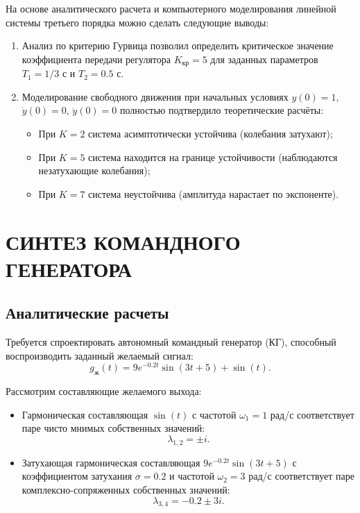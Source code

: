 \documentclass[14pt,a4paper]{extarticle}
\begin{document}
На основе аналитического расчета и компьютерного моделирования линейной системы третьего порядка можно сделать следующие выводы:
\begin{enumerate}
    \item Анализ по критерию Гурвица позволил определить критическое значение коэффициента передачи регулятора $K_{кр} = 5$ для заданных параметров $T_1 = 1/3$ с и $T_2 = 0.5$ с.
    \item Моделирование свободного движения при начальных условиях $y(0) = 1$, $\dot{y}(0) = 0$, $\ddot{y}(0) = 0$ полностью подтвердило теоретические расчёты:
    \begin{itemize}
        \item При $K = 2$ система асимптотически устойчива (колебания затухают);
        \item При $K = 5$ система находится на границе устойчивости (наблюдаются незатухающие колебания);
        \item При $K = 7$ система неустойчива (амплитуда нарастает по экспоненте).
    \end{itemize}
\end{enumerate}


\newpage
\section{СИНТЕЗ КОМАНДНОГО ГЕНЕРАТОРА}

\subsection{Аналитические расчеты}

Требуется спроектировать автономный командный генератор (КГ), способный воспроизводить заданный желаемый сигнал:
\[
    g_{\text{ж}}(t) = 9e^{-0.2t}\sin(3t + 5) + \sin(t).
\]

Рассмотрим составляющие желаемого выхода:
\begin{itemize}
    \item Гармоническая составляющая $\sin(t)$ с частотой $\omega_1 = 1$ рад/с соответствует паре чисто мнимых собственных значений:
    \[
        \lambda_{1,2} = \pm i.
    \]
    \item Затухающая гармоническая составляющая $9e^{-0.2t}\sin(3t + 5)$ с коэффициентом затухания $\sigma = 0.2$ и частотой $\omega_2 = 3$ рад/с соответствует паре комплексно-сопряженных собственных значений:
    \[
        \lambda_{3,4} = -0.2 \pm 3i.
    \]
\end{itemize}
\end{document}
